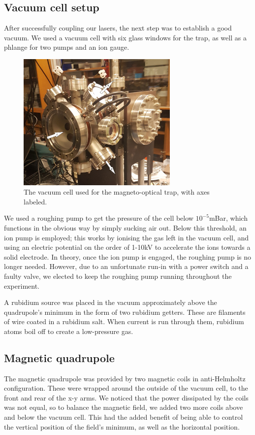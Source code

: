 \documentclass[11pt,twoside,a4paper]{article}
\begin{document}
\subsection{Vacuum cell setup}
After successfully coupling our lasers, the next step was to establish a good vacuum. We used a vacuum cell with six glass windows for the trap, as well as a phlange for two pumps and an ion gauge.
\begin{figure}[h]
    \centering
    \includegraphics[width=0.7\textwidth]{images/mot}
    \caption{The vacuum cell used for the magneto-optical trap, with axes labeled.}
\end{figure}

We used a roughing pump to get the pressure of the cell below \(10^{-5}\)mBar, which functions in the obvious way by simply sucking air out. Below this threshold, an ion pump is employed; this works by
ionising the gas left in the vacuum cell, and using an electric potential on the order of 1-10kV to accelerate the ions towards a solid electrode. In theory, once the ion pump is engaged, the roughing
pump is no longer needed. However, due to an unfortunate run-in with a power switch and a faulty valve, we elected to keep the roughing pump running throughout the experiment.

A rubidium source was placed in the vacuum approximately above the quadrupole's minimum in the form of two rubidium getters. These are filaments of wire coated in a rubidium salt. When current is run
through them, rubidium atoms boil off to create a low-pressure gas.
\subsection{Magnetic quadrupole}
The magnetic quadrupole was provided by two magnetic coils in anti-Helmholtz configuration. These were wrapped around the outside of the vacuum cell, to the front and rear of the x-y arms.
We noticed that the power dissipated by the coils was not equal, so to balance the magnetic field, we added two more coils above and below the vacuum cell. This had the added benefit of being able to
control the vertical position of the field's minimum, as well as the horizontal position.
\end{document}
